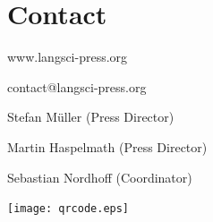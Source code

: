 \documentclass[
notumble,
nofoldmark,
]{leaflet}
\begin{document}
\section{\sffamily\Large Contact}
\parbox{.7\textwidth}{
{  \sffamily www.langsci-press.org}

{  \sffamily  contact@langsci-press.org}

Stefan M\"uller (Press Director)

Martin Haspelmath (Press Director)

Sebastian Nordhoff (Coordinator)

}
\parbox{.28\textwidth}{
\texttt{[image: qrcode.eps]}
}








% 

 

\loggingall
\end{document}
